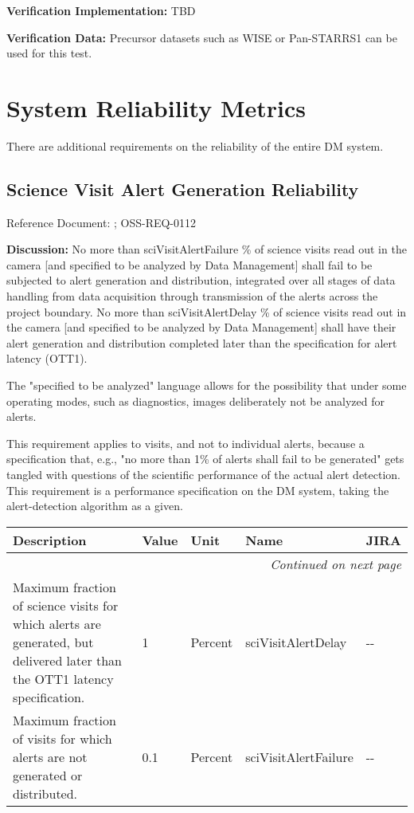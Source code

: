 \documentclass[DM,lsstdraft,toc]{lsstdoc}
\makeatletter
\newenvironment{metric}[0]{%
\setlength\LTleft{0pt}
\setlength\LTright{\fill}
\begin{longtable}[]{@{}p{0.4\textwidth}lp{0.75in}p{1.3in}p{0.75in}@{}}

\hline \textbf{Description} & \textbf{Value} & \textbf{Unit} & \textbf{Name} & \textbf{JIRA} \\ \hline
\endhead

\hline \multicolumn{5}{r}{\emph{Continued on next page}} \\
\endfoot

\hline\hline
\endlastfoot
}{%
\hline
\end{longtable}
}
\makeatother
\begin{document}
\textbf{Verification Implementation:} TBD

\textbf{Verification Data:} Precursor datasets such as WISE or
Pan-STARRS1 can be used for this test.

\section{System Reliability Metrics}\label{system-reliability-metrics}

There are additional requirements on the reliability of the entire DM
system.

\subsection{Science Visit Alert Generation
Reliability}\label{science-visit-alert-generation-reliability}

Reference Document: ; OSS-REQ-0112

\textbf{Discussion:} No more than sciVisitAlertFailure \% of science
visits read out in the camera {[}and specified to be analyzed by Data
Management{]} shall fail to be subjected to alert generation and
distribution, integrated over all stages of data handling from data
acquisition through transmission of the alerts across the project
boundary. No more than sciVisitAlertDelay \% of science visits read out
in the camera {[}and specified to be analyzed by Data Management{]}
shall have their alert generation and distribution completed later than
the \SRD specification for alert latency (OTT1).

The "specified to be analyzed" language allows for the possibility that
under some operating modes, such as diagnostics, images deliberately not
be analyzed for alerts.

This requirement applies to visits, and not to individual alerts,
because a specification that, e.g., "no more than 1\% of alerts shall
fail to be generated" gets tangled with questions of the scientific
performance of the actual alert detection. This requirement is a
performance specification on the DM system, taking the alert-detection
algorithm as a given.

\begin{metric}
Maximum fraction of science visits for which alerts are generated, but
delivered later than the OTT1 latency specification. & 1 & Percent &
sciVisitAlertDelay & -\/-\tabularnewline
Maximum fraction of visits for which alerts are not generated or
distributed. & 0.1 & Percent & sciVisitAlertFailure &
-\/-\tabularnewline
\end{metric}
\end{document}
